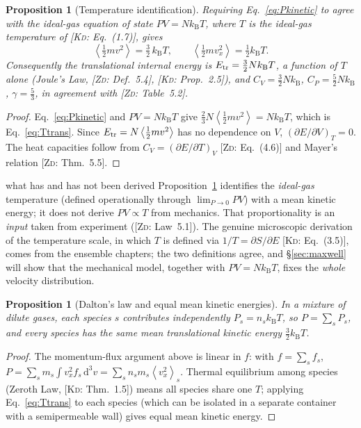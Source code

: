 \documentclass[11pt,a4paper]{report}
\theoremstyle{definition}
\theoremstyle{plain}
\newtheorem{proposition}[definition]{Proposition}
\newcommand{\KD}[1]{[\textsc{Kd}: #1]}   %
\newcommand{\ZD}[1]{[\textsc{Zd}: #1]}   %
\newcommand{\kB}{k_{\mathrm{B}}}
\newcommand{\dd}{\mathrm{d}}
\newcommand{\avg}[1]{\left\langle #1\right\rangle}
\begin{document}
\begin{proposition}[Temperature identification]\label{prop:Tident}
Requiring Eq.~\eqref{eq:Pkinetic} to agree with the ideal-gas equation of state $PV=N\kB T$, where $T$ is the ideal-gas temperature of \KD{Eq.~(1.7)}, gives
\begin{equation}
\avg{\tfrac12 mv^2}=\tfrac32\,\kB T,\qquad \avg{\tfrac12 mv_x^2}=\tfrac12\kB T .
\label{eq:Ttrans}
\end{equation}
Consequently the translational internal energy is $E_{\rm tr}=\tfrac32N\kB T$, a function of $T$ alone (Joule's Law, \ZD{Def.~5.4}, \KD{Prop.~2.5}), and $C_V=\tfrac32N\kB$, $C_P=\tfrac52N\kB$, $\gamma=\tfrac53$, in agreement with \ZD{Table~5.2}.
\end{proposition}

\begin{proof}
Eq.~\eqref{eq:Pkinetic} and $PV=N\kB T$ give $\tfrac23N\avg{\tfrac12mv^2}=N\kB T$, which is Eq.~\eqref{eq:Ttrans}. Since $E_{\rm tr}=N\avg{\tfrac12mv^2}$ has no dependence on $V$, $(\partial E/\partial V)_T=0$. The heat capacities follow from $C_V=(\partial E/\partial T)_V$ \ZD{Eq.~(4.6)} and Mayer's relation \ZD{Thm.~5.5}.
\end{proof}

\begin{pitfall}{what has and has not been derived}
Proposition~\ref{prop:Tident} identifies the \emph{ideal-gas} temperature (defined operationally through $\lim_{P\to0}PV$) with a mean kinetic energy; it does not derive $PV\propto T$ from mechanics. That proportionality is an \emph{input} taken from experiment (\ZD{Law~5.1}). The genuine microscopic derivation of the temperature scale, in which $T$ is defined via $1/T=\partial S/\partial E$ \KD{Eq.~(3.5)}, comes from the ensemble chapters; the two definitions agree, and \S\ref{sec:maxwell} will show that the mechanical model, together with $PV=N\kB T$, fixes the \emph{whole} velocity distribution.
\end{pitfall}

\begin{proposition}[Dalton's law and equal mean kinetic energies]\label{prop:dalton}
In a mixture of dilute gases, each species $s$ contributes independently $P_s=n_s\kB T$, so $P=\sum_sP_s$, and every species has the same mean translational kinetic energy $\tfrac32\kB T$.
\end{proposition}
\begin{proof}
The momentum-flux argument above is linear in $f$: with $f=\sum_sf_s$, $P=\sum_s m_s\int v_x^2f_s\,\dd^3v=\sum_sn_sm_s\avg{v_x^2}_s$. Thermal equilibrium among species (Zeroth Law, \KD{Thm.~1.5}) means all species share one $T$; applying Eq.~\eqref{eq:Ttrans} to each species (which can be isolated in a separate container with a semipermeable wall) gives equal mean kinetic energy.
\end{proof}
\end{document}
